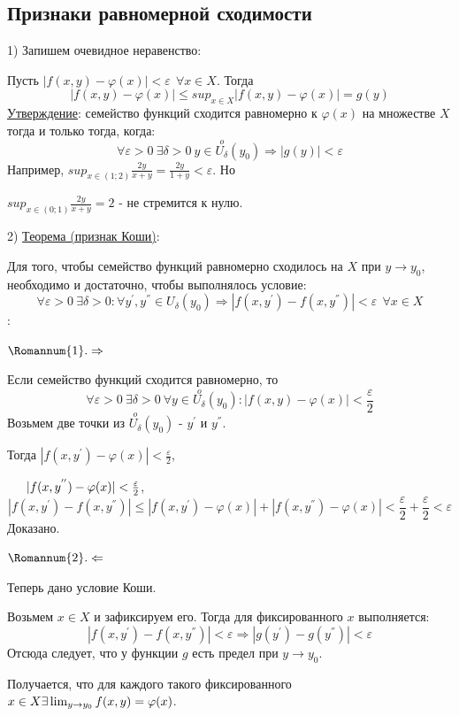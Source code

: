\documentclass[12pt]{article}
\begin{document}
\subsection{Признаки равномерной сходимости}
1) Запишем очевидное неравенство:\par
Пусть $|f(x,y)-\varphi(x)|<\varepsilon \ \ \forall x \in X$. Тогда
$$|f(x,y)-\varphi(x)| \leq sup_{x \in X} |f(x,y) - \varphi(x)| = g(y)$$
\uline{Утверждение}: семейство функций сходится равномерно к $\varphi(x)$ на множестве $X$ тогда и только тогда, когда:
$$\forall \varepsilon > 0 \ \exists \delta > 0 \ y \in \overset{o}{U_{\delta}}(y_0) \Rightarrow |g(y)|<\varepsilon$$
Например, $sup_{x\in (1;2)} \frac{2y}{x+y} = \frac{2y}{1+y} < \varepsilon$. Но\par
$sup_{x \in (0;1)} \frac{2y}{x+y} = 2$ - не стремится к нулю.\par
2) \uline{Теорема (признак Коши)}:\par
Для того, чтобы семейство функций равномерно сходилось на $X$ при $y \to y_0$, необходимо и достаточно, чтобы выполнялось условие:
$$\forall \varepsilon > 0 \ \exists \delta > 0 : \forall y^{'}, y^{''} \in U_{\delta}(y_0) \Rightarrow |f(x,y^{'})-f(x,y^{''})| < \varepsilon \ \ \forall x \in X$$
:\par
$\Romannum{1}. \Rightarrow$\par
Если семейство функций сходится равномерно, то
$$\forall \varepsilon > 0 \ \exists \delta > 0 \  \forall y \in \overset{o}{U_\delta}(y_0): |f(x,y)-\varphi(x)|<\frac{\varepsilon}{2}$$
Возьмем две точки из $\overset{o}{U_\delta}(y_0)$ - $y^{'}$ и $y^{''}$.\par
Тогда $|f(x,y^{'})-\varphi(x)| < \frac{\varepsilon}{2}$,\par
$\indent |f(x,y^{''})-\varphi(x)| < \frac{\varepsilon}{2}$,
$$|f(x,y^{'})-f(x,y^{''})| \leq |f(x,y^{'})-\varphi(x)| + |f(x,y^{''})-\varphi(x)| < \frac{\varepsilon}{2} + \frac{\varepsilon}{2} < \varepsilon$$
Доказано.\par
$\Romannum{2}. \Leftarrow$\par
Теперь дано условие Коши.\par
Возьмем $x \in X$ и зафиксируем его. Тогда для фиксированного $x$ выполняется:
$$|f(x,y^{'})-f(x,y^{''})| < \varepsilon \Rightarrow |g(y^{'})-g(y^{''})| < \varepsilon$$
Отсюда следует, что у функции $g$ есть предел при $y \to y_0$.\par
Получается, что для каждого такого фиксированного $x \in X \\ \exists \lim_{y \to y_0} f(x,y) = \varphi(x)$.\par
\end{document}
